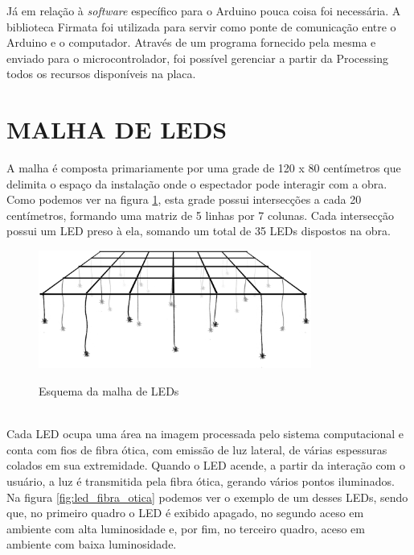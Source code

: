 Já em relação à \textit{software} específico para o Arduino pouca coisa foi necessária. A biblioteca Firmata foi utilizada para servir como ponte de comunicação entre o Arduino e o computador. Através de um programa fornecido pela mesma e enviado para o microcontrolador, foi possível gerenciar a partir da Processing todos os recursos disponíveis na placa.

\section{MALHA DE LEDS}
\label{sec:malha}

A malha é composta primariamente por uma grade de 120 x 80 centímetros que delimita o espaço da instalação onde o espectador pode interagir com a obra. Como podemos ver na figura \ref{fig:malha}, esta grade possui intersecções a cada 20 centímetros, formando uma matriz de 5 linhas por 7 colunas. Cada intersecção possui um LED preso à ela, somando um total de 35 LEDs dispostos na obra.

\begin{figure}[H]
    \centering
    \caption{Esquema da malha de LEDs}
	\vspace*{0,2cm}
    \includegraphics[width=0.8\textwidth]{./04-figuras/malha}
    \label{fig:malha}
\end{figure}
\vspace*{-0,9cm}
{\raggedright {}}\\

Cada LED ocupa uma área na imagem processada pelo sistema computacional e conta com fios de fibra ótica, com emissão de luz lateral, de várias espessuras colados em sua extremidade. Quando o LED acende, a partir da interação com o usuário, a luz é transmitida pela fibra ótica, gerando vários pontos iluminados. Na figura \ref{fig:led_fibra_otica} podemos ver o exemplo de um desses LEDs, sendo que, no primeiro quadro o LED é exibido apagado, no segundo aceso em ambiente com alta luminosidade e, por fim, no terceiro quadro, aceso em ambiente com baixa luminosidade. 

